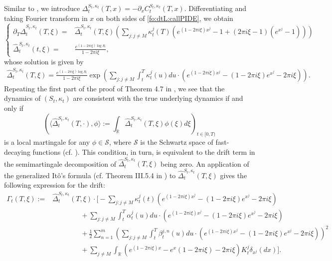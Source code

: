 \documentclass{article}
\numberwithin{equation}{section}
\newcommand\half {\frac{1}{2}}
\newcommand\RR {\mathbb R}
\def\hD{\hat{\Delta}}
\begin{document}
Similar to \cite{carmona2010tangentlevy}, we introduce $\Delta_t^{S_t,\kappa_t}(T,x) = - \partial_x C_t^{S_t,\kappa_t}(T,x)$. Differentiating and taking Fourier transform in $x$ on both sides of \eqref{fo:dtL:callPIDE}, we obtain
\begin{equation*}
\left\{
\begin{array}{rl}
\partial_{T} \hD_t^{S_t,\kappa_t}(T,\xi)= & \hD_t^{S_t,\kappa_t}(T,\xi) \left( \underset{j:j\neq M}\sum \kappa_t^j(T) \left( e^{(1-2\pi i\xi) x^j} - 1 + (2\pi i\xi - 1) (e^{x^j}-1)\right) \right)  \\
\hD_t^{S_t,\kappa_t}(t,\xi) = & \frac{e^{(1-2\pi i\xi) \log S_t}} {1-2\pi i\xi},
\end{array}
\right.
\end{equation*}
whose solution is given by
\begin{align}
\hD_t^{S_t,\kappa_t}(T,\xi) = \frac{e^{(1-2\pi i\xi)\log S_t}}{1-2\pi i\xi} \exp \left(\underset{j:j\neq M}\sum \int_t^T \kappa_t^j(u)du \cdot \left( e^{(1-2\pi i\xi) x^j} - (1 - 2\pi i\xi)e^{x^j}- 2\pi i\xi \right) \right).
\end{align}
Repeating the first part of the proof of Theorem 4.7 in \cite{carmona2010tangentlevy}, we see that the dynamics of $(S_t,\kappa_t)$ are consistent with the true underlying dynamics if and only if
\begin{equation*}
\left(\langle \hD_t^{S_t,\kappa_t}(T,\cdot), \phi \rangle := \int_{\RR}\hD_t^{S_t,\kappa_t}(T,\xi)\phi(\xi)d\xi\right)_{t\in[0,T)}
\end{equation*}
is a local martingale for any $\phi\in \mathcal{S}$, where $\mathcal{S}$ is the Schwartz space of fast-decaying functions (cf. \cite{carmona2010tangentlevy}).
This condition, in turn, is equivalent to the drift term in the semimartingale decomposition of $\hD_t^{S_t,\kappa_t}(T,\xi)$ being zero. An application of the generalized It\^{o}'s formula (cf. Theorem III.5.4 in \cite{Kuo}) to $\hD_t^{S_t,\kappa_t}(T,\xi)$ gives the following expression for the drift:
\begin{align*}
\Gamma_t(T,\xi) := & \hD_t^{S_t,\kappa_t}(T,\xi) \cdot \bigg[ -\underset{j:j\neq M}\sum \kappa_t^j(t) \left( e^{(1-2\pi i\xi) x^j} - (1 - 2\pi i\xi)e^{x^j} - 2\pi i\xi \right) \\
& \qquad \quad \quad + \underset{j:j\neq M}\sum \int_t^T \alpha_t^j(u)du \cdot \left( e^{(1-2\pi i\xi) x^j} - (1 - 2\pi i\xi)e^{x^j}- 2\pi i\xi \right) \\
& \qquad \quad \quad + \half \sum_{n=1}^m \left( \underset{j:j\neq M}\sum  \int_t^T \beta_t^{j,n}(u)du \cdot \left( e^{(1-2\pi i\xi) x^j} - (1 - 2\pi i\xi)e^{x^j}- 2\pi i\xi \right)\right)^2  \\
&\qquad \quad \quad +  \sum_{j\neq M} \int_\RR \left(e^{(1-2 \pi i\xi)x} - e^x(1-2\pi i \xi) - 2\pi i\xi\right)K^j_t \delta_{x^j}(dx) \bigg].
\end{align*}
\end{document}
